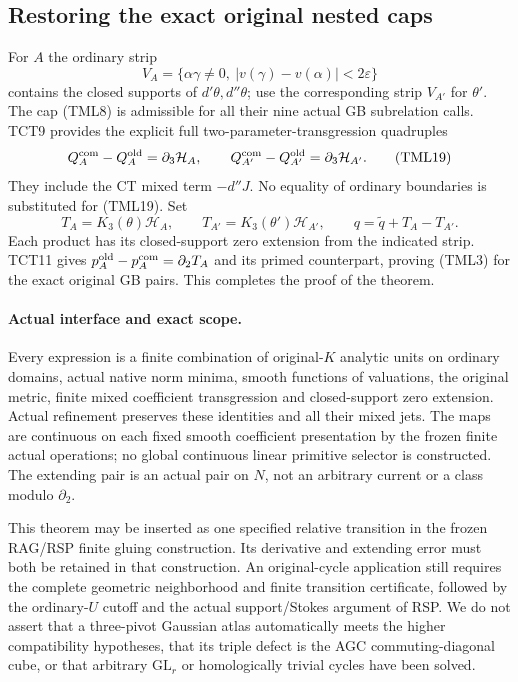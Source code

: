 \subsection{Restoring the exact original nested caps}

For $A$ the ordinary strip
\[
 V_A=\{\alpha\gamma\ne0,\ |v(\gamma)-v(\alpha)|<2\varepsilon\}
 \tag{TML18}
\]
contains the closed supports of $d'\theta,d''\theta$;
use the corresponding strip $V_{A'}$ for $\theta'$.
The cap (TML8) is admissible for all their nine actual GB
subrelation calls.  TCT9 provides the explicit full
two-parameter-transgression quadruples
\[
 Q_A^{\rm com}-Q_A^{\rm old}=\partial_3\mathcal H_A,
 \qquad Q_{A'}^{\rm com}-Q_{A'}^{\rm old}
                                      =\partial_3\mathcal H_{A'}.
 \tag{TML19}
\]
They include the CT mixed term $-d''J$.  No equality of ordinary
boundaries is substituted for (TML19).  Set
\[
 T_A=K_3(\theta)\mathcal H_A,\qquad
 T_{A'}=K_3(\theta')\mathcal H_{A'},\qquad
                         q=\widetilde q+T_A-T_{A'}.
 \tag{TML20}
\]
Each product has its closed-support zero extension from the
indicated strip.  TCT11 gives
$p_A^{\rm old}-p_A^{\rm com}=\partial_2T_A$ and its primed
counterpart, proving (TML3) for the exact original GB pairs.
This completes the proof of the theorem.

\paragraph{Actual interface and exact scope.}
Every expression is a finite combination of original-$K$ analytic
units on ordinary domains, actual native norm minima, smooth
functions of valuations, the original metric, finite mixed
coefficient transgression and closed-support zero extension.
Actual refinement preserves these identities and all their mixed
jets.  The maps are continuous on each fixed smooth coefficient
presentation by the frozen finite actual operations; no global
continuous linear primitive selector is constructed.  The
extending pair is an actual pair on $N$, not an arbitrary current
or a class modulo $\partial_2$.

This theorem may be inserted as one specified relative transition
in the frozen RAG/RSP finite gluing construction.  Its derivative
and extending error must both be retained in that construction.
An original-cycle application still requires the complete
geometric neighborhood and finite transition certificate, followed
by the ordinary-$U$ cutoff and the actual support/Stokes argument
of RSP.  We do not assert that a three-pivot Gaussian atlas
automatically meets the higher compatibility hypotheses, that its
triple defect is the AGC commuting-diagonal cube, or that arbitrary
$\mathrm{GL}_r$ or homologically trivial cycles have been solved.

